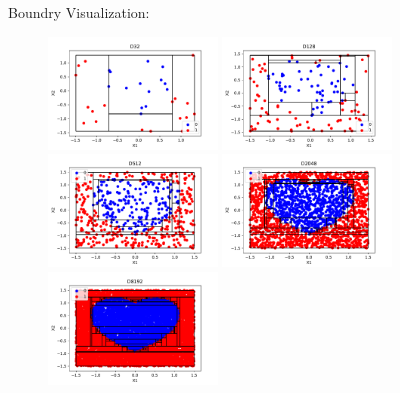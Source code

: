 \documentclass[a4paper]{article}
\theoremstyle{definition}
\newenvironment{soln}{
    \leavevmode\color{blue}\ignorespaces
}{}
\begin{document}
\begin{enumerate}
\begin{soln}
Boundry Visualization:
	    \begin{figure}[H]
	        \centering
	        \includegraphics[width=0.4\textwidth]{question70.pdf}
	        \includegraphics[width=0.4\textwidth]{question71.pdf}
	        \includegraphics[width=0.4\textwidth]{question72.pdf}
	        \includegraphics[width=0.4\textwidth]{question73.pdf}
	        \includegraphics[width=0.4\textwidth]{question74.pdf}
	        \captionsetup{labelformat=empty}
	        \caption{}
	        \label{fig:my_label}
	    \end{figure}

\end{soln}

\end{enumerate}
\end{document}
